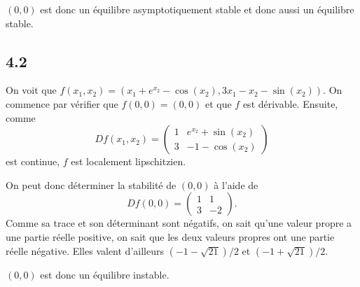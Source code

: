 \documentclass{article}
\begin{document}
$(0,0)$ est donc un équilibre asymptotiquement stable et donc aussi
un équilibre stable.

\subsection*{4.2}
On voit que $f(x_1,x_2) = (x_1 + e^{x_2} - \cos(x_2), 3x_1 - x_2 - \sin(x_2))$.
On commence par vérifier que $f(0,0) = (0,0)$ et que $f$ est dérivable.
Ensuite, comme
\[ Df(x_1,x_2) =
\begin{pmatrix}
  1 & e^{x_2} + \sin(x_2)\\
  3 & -1 - \cos(x_2)
\end{pmatrix} \]
est continue, $f$ est localement lipschitzien.

On peut donc déterminer la stabilité de $(0,0)$ à l'aide de
\[ Df(0, 0) =
\begin{pmatrix}
  1 & 1\\
  3 & -2
\end{pmatrix}. \]
Comme sa trace et son déterminant sont négatifs,
on sait qu'une valeur propre a une partie réelle positive,
on sait que les deux valeurs propres ont une partie réelle négative.
Elles valent d'ailleurs $(-1 - \sqrt{21})/2$ et $(-1+\sqrt{21})/2$.

$(0,0)$ est donc un équilibre instable.
\end{document}
